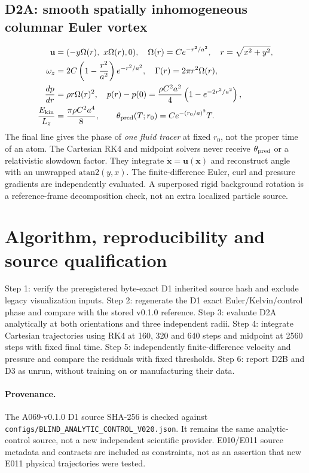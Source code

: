 \documentclass[10pt,a4paper]{article}
\begin{document}
\subsection{D2A: smooth spatially inhomogeneous columnar Euler vortex}
\begin{align}
\mathbf u&=(-y\Omega(r),\ x\Omega(r),0),\quad
\Omega(r)=C e^{-r^2/a^2},\quad r=\sqrt{x^2+y^2},\\
\omega_z&=2C\left(1-\frac{r^2}{a^2}\right)e^{-r^2/a^2},\quad
\Gamma(r)=2\pi r^2\Omega(r),\\
\frac{dp}{dr}&=\rho r\Omega(r)^2,\quad
p(r)-p(0)=\frac{\rho C^2a^2}{4}\left(1-e^{-2r^2/a^2}\right),\\
\frac{E_{\rm kin}}{L_z}&=\frac{\pi\rho C^2a^4}{8},\qquad
\theta_{\rm pred}(T;r_0)=C e^{-(r_0/a)^2}T.
\end{align}
The final line gives the phase of \emph{one fluid tracer} at fixed $r_0$,
not the proper time of an atom. The Cartesian RK4 and midpoint solvers never
receive $\theta_{\rm pred}$ or a relativistic slowdown factor. They integrate
$\dot{\mathbf x}=\mathbf u(\mathbf x)$ and reconstruct angle with an unwrapped
$\mathrm{atan2}(y,x)$. The finite-difference Euler, curl and pressure gradients
are independently evaluated. A superposed rigid background rotation is a
reference-frame decomposition check, not an extra localized particle source.
\section{Algorithm, reproducibility and source qualification}
Step 1: verify the preregistered byte-exact D1 inherited source hash and exclude
legacy visualization inputs. Step 2: regenerate the D1 exact Euler/Kelvin/control
phase and compare with the stored v0.1.0 reference. Step 3: evaluate D2A
analytically at both orientations and three independent radii. Step 4: integrate
Cartesian trajectories using RK4 at 160, 320 and 640 steps and midpoint at
2560 steps with fixed final time. Step 5: independently finite-difference
velocity and pressure and compare the residuals with fixed thresholds. Step 6:
report D2B and D3 as unrun, without training on or manufacturing their data.
\paragraph{Provenance.}
The A069-v0.1.0 D1 source SHA-256 is checked against
\texttt{configs/BLIND\_ANALYTIC\_CONTROL\_V020.json}. It remains the
same analytic-control source, not a new independent scientific provider.
E010/E011 source metadata and contracts are included as constraints, not as
an assertion that new E011 physical trajectories were tested.
\end{document}
